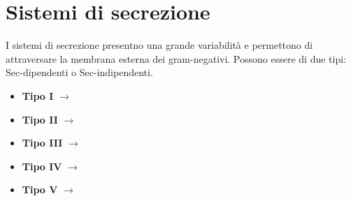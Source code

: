 \section{Sistemi di secrezione}
I sistemi di secrezione presentno una grande variabilit\`a e permettono di attraversare la membrana esterna dei gram-negativi. Possono essere di due tipi: Sec-dipendenti o Sec-indipendenti.
\begin{itemize}
    \item \textbf{Tipo I} $\xrightarrow{}$ 
    \item \textbf{Tipo II} $\xrightarrow{}$ 
    \item \textbf{Tipo III} $\xrightarrow{}$ 
    \item \textbf{Tipo IV} $\xrightarrow{}$
    \item \textbf{Tipo V} $\xrightarrow{}$ 
\end{itemize}
